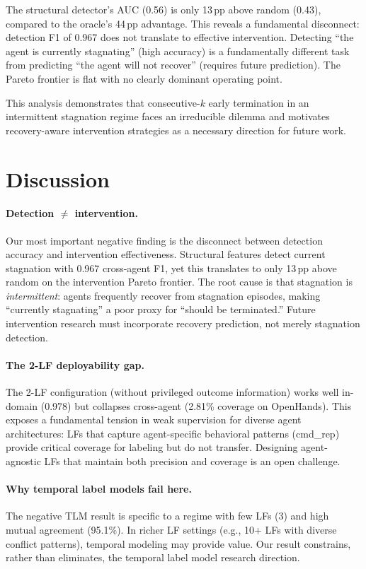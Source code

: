 \documentclass[11pt,a4paper]{article}
\begin{document}
The structural detector's AUC (0.56) is only 13\,pp above random (0.43), compared to the oracle's 44\,pp advantage.
This reveals a fundamental disconnect: detection F1 of 0.967 does not translate to effective intervention.
Detecting ``the agent is currently stagnating'' (high accuracy) is a fundamentally different task from predicting ``the agent will not recover'' (requires future prediction).
The Pareto frontier is flat with no clearly dominant operating point.

This analysis demonstrates that consecutive-$k$ early termination in an intermittent stagnation regime faces an irreducible dilemma and motivates recovery-aware intervention strategies as a necessary direction for future work.

\section{Discussion}
\label{sec:discussion}

\paragraph{Detection $\neq$ intervention.}
Our most important negative finding is the disconnect between detection accuracy and intervention effectiveness.
Structural features detect current stagnation with 0.967 cross-agent F1, yet this translates to only 13\,pp above random on the intervention Pareto frontier.
The root cause is that stagnation is \emph{intermittent}: agents frequently recover from stagnation episodes, making ``currently stagnating'' a poor proxy for ``should be terminated.''
Future intervention research must incorporate recovery prediction, not merely stagnation detection.

\paragraph{The 2-LF deployability gap.}
The 2-LF configuration (without privileged outcome information) works well in-domain (0.978) but collapses cross-agent (2.81\% coverage on OpenHands).
This exposes a fundamental tension in weak supervision for diverse agent architectures: LFs that capture agent-specific behavioral patterns (cmd\_rep) provide critical coverage for labeling but do not transfer.
Designing agent-agnostic LFs that maintain both precision and coverage is an open challenge.

\paragraph{Why temporal label models fail here.}
The negative TLM result is specific to a regime with few LFs (3) and high mutual agreement (95.1\%).
In richer LF settings (e.g., 10+ LFs with diverse conflict patterns), temporal modeling may provide value.
Our result constrains, rather than eliminates, the temporal label model research direction.
\end{document}
